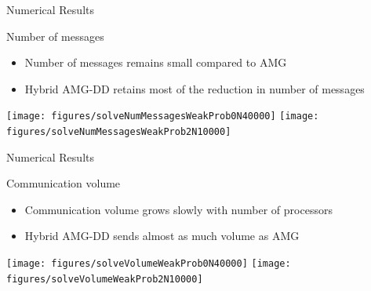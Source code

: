 \documentclass[18pt,xcolor=table]{beamer}
\begin{document}
\begin{frame}{Numerical Results}
\begin{block}{Number of messages}
\begin{itemize}
\item Number of messages remains small compared to AMG 
\item Hybrid AMG-DD retains most of the reduction in number of messages
\end{itemize}
\end{block}

\centering
\vspace{0.5 cm}
\texttt{[image: figures/solveNumMessagesWeakProb0N40000]}
\texttt{[image: figures/solveNumMessagesWeakProb2N10000]}

\end{frame}

\begin{frame}{Numerical Results}
\begin{block}{Communication volume}
\begin{itemize}
\item Communication volume grows  slowly with number of processors
\item Hybrid AMG-DD sends almost as much volume as AMG 
\end{itemize}
\end{block}

\centering
\vspace{0.5 cm}
\texttt{[image: figures/solveVolumeWeakProb0N40000]}
\texttt{[image: figures/solveVolumeWeakProb2N10000]}

\end{frame}

%
%
%
%
%
\end{document}
